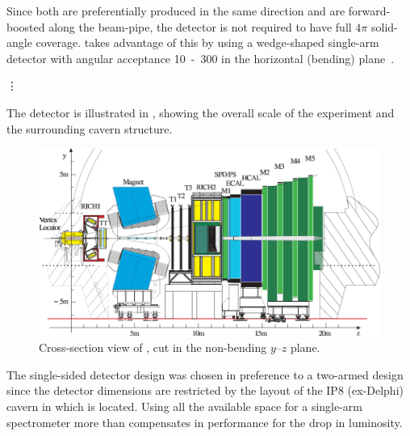 Since both  are preferentially produced in the same direction
and are forward-boosted along the beam-pipe, the detector is not required
to have full $4\pi$ solid-angle coverage. \LHCb takes advantage of this
by using a wedge-shaped single-arm detector with angular acceptance
\unit{10-300}{\mrad} in the horizontal (bending) plane~\cite{Amato:1998xt}.

\vspace{1cm}

\begin{center}
{\hspace{1mm}\Large\vdots\hspace{1cm}}
\end{center}

\vspace{1cm}

The detector is illustrated in , showing
the overall scale of the experiment and the surrounding cavern structure.

\begin{figure}
  \begin{center}
  \includegraphics[width=0.8\textheight]{diagrams/3_chips/lhcb-detector-cross-section}
  \caption[Cross-section view of \LHCb, cut in the non-bending $y$--$z$ plane]%
    {Cross-section view of \LHCb, cut in the non-bending $y$--$z$ plane.}
  \label{fig:LHCbCrossSection}
  \end{center}
\end{figure}

The single-sided detector design was chosen in preference to a two-armed
design since the detector dimensions are restricted by the layout of the
IP8 (ex-Delphi) cavern in which \LHCb is located. Using all the available
space for a single-arm spectrometer more than compensates in performance
for the \about{50\percent} drop in luminosity.

